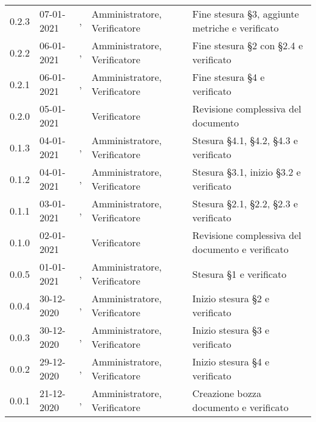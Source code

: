 {\begin{longtable}{C{1.7cm} | C{2.5cm} | C{3.2cm} | C{2.9cm} | C{4.6cm}}
0.2.3 & 07-01-2021 & \ZM{}, \BM{} & Amministratore, Verificatore & Fine stesura \S 3, aggiunte metriche e verificato\\
0.2.2 & 06-01-2021 & \PA{}, \SP{} & Amministratore, Verificatore & Fine stesura \S 2 con \S 2.4 e verificato\\
0.2.1 & 06-01-2021 & \RA{}, \BM{} & Amministratore, Verificatore & Fine stesura \S 4 e verificato\\
0.2.0 & 05-01-2021 & \BM{} & Verificatore & Revisione complessiva del documento \\
0.1.3 & 04-01-2021 & \RA{}, \SP{} & Amministratore, Verificatore & Stesura \S 4.1, \S 4.2, \S 4.3 e verificato\\
0.1.2 & 04-01-2021 & \ZM{}, \BM{} & Amministratore, Verificatore & Stesura \S 3.1, inizio \S 3.2 e verificato\\
0.1.1 & 03-01-2021 & \PA{}, \SP{} & Amministratore, Verificatore & Stesura \S 2.1, \S 2.2, \S 2.3 e verificato\\
0.1.0 & 02-01-2021 & \BM{} & Verificatore & Revisione complessiva del documento e verificato\\
0.0.5 & 01-01-2021 & \ZM{}, \SP{} & Amministratore, Verificatore & Stesura \S 1 e verificato\\
0.0.4 & 30-12-2020 & \PA{}, \SP{} & Amministratore, Verificatore & Inizio stesura \S 2 e verificato\\
0.0.3 & 30-12-2020 & \ZM{}, \BM{} & Amministratore, Verificatore & Inizio stesura \S 3 e verificato\\
0.0.2 & 29-12-2020 & \RA{}, \SP{} & Amministratore, Verificatore & Inizio stesura \S 4 e verificato\\
0.0.1 & 21-12-2020 & \ZM{}, \BM{} & Amministratore, Verificatore & Creazione bozza documento e verificato\\	
\end{longtable}
}
